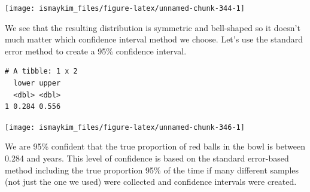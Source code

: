 \documentclass[12pt,]{krantz}
\makeatletter
\newenvironment{Shaded}{\begin{snugshade}}{\end{snugshade}}
\newcommand{\KeywordTok}[1]{\textcolor[rgb]{0.27,0.27,0.27}{\textbf{#1}}}
\newcommand{\DataTypeTok}[1]{\textcolor[rgb]{0.27,0.27,0.27}{#1}}
\newcommand{\DecValTok}[1]{\textcolor[rgb]{0.06,0.06,0.06}{#1}}
\newcommand{\FloatTok}[1]{\textcolor[rgb]{0.06,0.06,0.06}{#1}}
\newcommand{\StringTok}[1]{\textcolor[rgb]{0.5,0.5,0.5}{#1}}
\newcommand{\OperatorTok}[1]{\textcolor[rgb]{0.43,0.43,0.43}{\textbf{#1}}}
\newcommand{\NormalTok}[1]{#1}
\newenvironment{kframe}{%
\medskip{}
\setlength{\fboxsep}{.8em}
 \def\at@end@of@kframe{}%
 \ifinner\ifhmode%
  \def\at@end@of@kframe{\end{minipage}}%
  \begin{minipage}{\columnwidth}%
 \fi\fi%
 \def\FrameCommand##1{\hskip\@totalleftmargin \hskip-\fboxsep
 \colorbox{shadecolor}{##1}\hskip-\fboxsep
     \hskip-\linewidth \hskip-\@totalleftmargin \hskip\columnwidth}%
 \MakeFramed {\advance\hsize-\width
   \@totalleftmargin\z@ \linewidth\hsize
   \@setminipage}}%
 {\par\unskip\endMakeFramed%
 \at@end@of@kframe}
\renewenvironment{Shaded}{\begin{kframe}}{\end{kframe}}
\theoremstyle{definition}
\theoremstyle{definition}
\theoremstyle{definition}
\theoremstyle{remark}
\makeatother
\begin{document}
\begin{Shaded}
\end{Shaded}

\begin{center}\texttt{[image: ismaykim\_files/figure-latex/unnamed-chunk-344-1]} \end{center}

We see that the resulting distribution is symmetric and bell-shaped so
it doesn't much matter which confidence interval method we choose. Let's
use the standard error method to create a 95\% confidence interval.

\begin{Shaded}
\end{Shaded}

\begin{verbatim}
# A tibble: 1 x 2
  lower upper
  <dbl> <dbl>
1 0.284 0.556
\end{verbatim}

\begin{Shaded}
\end{Shaded}

\begin{center}\texttt{[image: ismaykim\_files/figure-latex/unnamed-chunk-346-1]} \end{center}

We are 95\% confident that the true proportion of red balls in the bowl
is between 0.284 and years. This level of confidence is based on the
standard error-based method including the true proportion 95\% of the
time if many different samples (not just the one we used) were collected
and confidence intervals were created.
\end{document}
